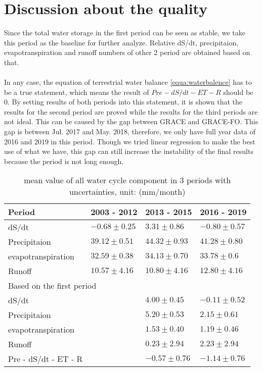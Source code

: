 \section{Discussion about the quality}
Since the total water storage in the first period can be seen as stable, we take this period as the baseline for further analyze. Relative dS/dt, precipitaion, evapotranspiration and runoff numbers of other 2 period are obtained based on that. \\\\
In any case, the equation of terrestrial water balance \autoref{equa:waterbalence} has to be a true statement, which means the result of $Pre-dS/dt-ET-R$ should be 0. By setting results of both periods into this statement, it is shown that the results for the second period are proved while the results for the third periods are not ideal. This can be caused by the gap between GRACE and GRACE-FO. This gap is between Jul. 2017 and May. 2018, therefore, we only have full year data of 2016 and 2019 in this period. Though we tried linear regression to make the best use of what we have, this gap can still increase the instability of the final results because the period is not long enough. 
\begin{table}[htbp]\centering
	\begin{tabular}{|l|l|l|l|}
		\hline
		Period &  2003 - 2012 & 2013 - 2015 & 2016 - 2019  \\ \hline
		dS/dt            & $-0.68 \pm 0.25$     & $3.31 \pm 0.86$        & $-0.80 \pm 0.57$        \\ \hline
		Precipitaion               & $39.12 \pm 0.51$      & $44.32 \pm 0.93$       &$41.28 \pm 0.80$        \\ \hline
		evapotranspiration           & $32.59 \pm 0.38$       & $34.13 \pm 0.70$       & $33.78 \pm 0.6$        \\ \hline
		Runoff                     & $10.57  \pm 4.16$      & $10.80 \pm 4.16 $     & $12.80 \pm 4.16 $      \\ \hline
		\multicolumn{4}{|l|}{Based on the first period}                                         \\ \hline
		dS/dt           &             & $4.00 \pm 0.45$        & $-0.11 \pm 0.52$        \\ \hline
		Precipitaion               &             & $5.20 \pm 0.53$        & $2.15 \pm 0.61$         \\ \hline
		evapotranspiration           &             & $1.53 \pm 0.40$        & $1.19 \pm 0.46 $        \\ \hline
		Runoff                     &             & $0.23 \pm 2.94 $       & $2.23 \pm 2.94   $      \\ \hline
		Pre - dS/dt - ET - R &             & $-0.57 \pm 0.76$       & $-1.14 \pm 0.76 $    \\ \hline 
	\end{tabular}
	\caption{mean value of all water cycle component in 3 periods with uncertainties, unit: (mm/month)}
\end{table}